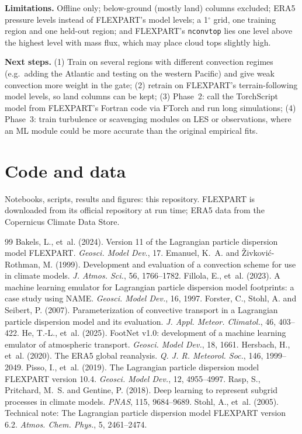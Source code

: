 \documentclass[11pt,a4paper]{article}
\begin{document}
\textbf{Limitations.} Offline only; below-ground (mostly land) columns excluded; ERA5 pressure levels
instead of FLEXPART's model levels; a 1$^\circ$ grid, one training region and one held-out region; and FLEXPART's \texttt{nconvtop} lies one
level above the highest level with mass flux, which may place cloud tops slightly high.

\textbf{Next steps.} (1) Train on several regions with different convection regimes (e.g.\ adding the
Atlantic and testing on the western Pacific) and give weak convection more weight in the gate;
(2) retrain on FLEXPART's terrain-following model levels, so land columns can be kept; (3) Phase~2: call
the TorchScript model from FLEXPART's Fortran code via FTorch and run long simulations; (4) Phase~3:
train turbulence or scavenging modules on LES or observations, where an ML module could be more
accurate than the original empirical fits.

\section*{Code and data}
Notebooks, scripts, results and figures: this repository. FLEXPART is downloaded from its official
repository at run time; ERA5 data from the Copernicus Climate Data Store.

\begin{thebibliography}{99}
 Bakels, L., et~al. (2024). Version 11 of the Lagrangian
particle dispersion model FLEXPART. \emph{Geosci. Model Dev.}, 17.
 Emanuel, K.~A. and
\v{Z}ivkovi\'{c}-Rothman, M. (1999). Development and evaluation of a convection scheme for use in
climate models. \emph{J. Atmos. Sci.}, 56, 1766--1782.
 Fillola, E., et~al. (2023). A machine learning emulator for
Lagrangian particle dispersion model footprints: a case study using NAME. \emph{Geosci. Model Dev.},
16, 1997.
 Forster, C., Stohl, A. and Seibert, P. (2007).
Parameterization of convective transport in a Lagrangian particle dispersion model and its evaluation.
\emph{J. Appl. Meteor. Climatol.}, 46, 403--422.
 He, T.-L., et~al. (2025). FootNet v1.0: development of a machine
learning emulator of atmospheric transport. \emph{Geosci. Model Dev.}, 18, 1661.
 Hersbach, H., et~al. (2020). The ERA5 global reanalysis.
\emph{Q. J. R. Meteorol. Soc.}, 146, 1999--2049.
 Pisso, I., et~al. (2019). The Lagrangian particle dispersion
model FLEXPART version 10.4. \emph{Geosci. Model Dev.}, 12, 4955--4997.
 Rasp, S., Pritchard, M.~S. and Gentine, P. (2018). Deep learning
to represent subgrid processes in climate models. \emph{PNAS}, 115, 9684--9689.
 Stohl, A., et~al. (2005). Technical note: The Lagrangian
particle dispersion model FLEXPART version 6.2. \emph{Atmos. Chem. Phys.}, 5, 2461--2474.
\end{thebibliography}
\end{document}
